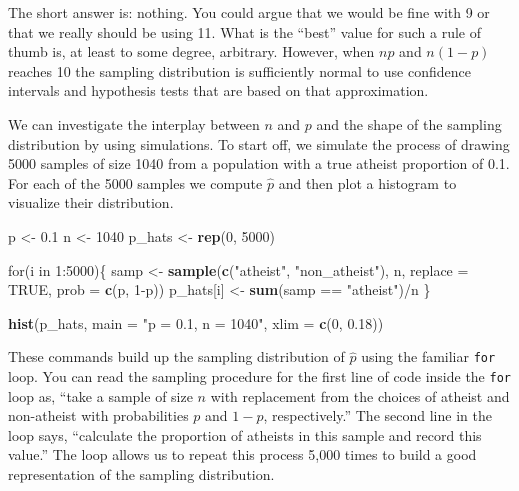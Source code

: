 \documentclass[]{book}
\newenvironment{Shaded}{\begin{snugshade}}{\end{snugshade}}
\newcommand{\KeywordTok}[1]{\textcolor[rgb]{0.13,0.29,0.53}{\textbf{{#1}}}}
\newcommand{\DataTypeTok}[1]{\textcolor[rgb]{0.13,0.29,0.53}{{#1}}}
\newcommand{\DecValTok}[1]{\textcolor[rgb]{0.00,0.00,0.81}{{#1}}}
\newcommand{\FloatTok}[1]{\textcolor[rgb]{0.00,0.00,0.81}{{#1}}}
\newcommand{\StringTok}[1]{\textcolor[rgb]{0.31,0.60,0.02}{{#1}}}
\newcommand{\OtherTok}[1]{\textcolor[rgb]{0.56,0.35,0.01}{{#1}}}
\newcommand{\NormalTok}[1]{{#1}}
\theoremstyle{definition}
\theoremstyle{definition}
\theoremstyle{remark}
\begin{document}
The short answer is: nothing. You could argue that we would be fine with
9 or that we really should be using 11. What is the ``best'' value for
such a rule of thumb is, at least to some degree, arbitrary. However,
when \(np\) and \(n(1-p)\) reaches 10 the sampling distribution is
sufficiently normal to use confidence intervals and hypothesis tests
that are based on that approximation.

We can investigate the interplay between \(n\) and \(p\) and the shape
of the sampling distribution by using simulations. To start off, we
simulate the process of drawing 5000 samples of size 1040 from a
population with a true atheist proportion of 0.1. For each of the 5000
samples we compute \(\hat{p}\) and then plot a histogram to visualize
their distribution.

\begin{Shaded}
\begin{Highlighting}[]
\NormalTok{p <-}\StringTok{ }\FloatTok{0.1}
\NormalTok{n <-}\StringTok{ }\DecValTok{1040}
\NormalTok{p_hats <-}\StringTok{ }\KeywordTok{rep}\NormalTok{(}\DecValTok{0}\NormalTok{, }\DecValTok{5000}\NormalTok{)}

\NormalTok{for(i in }\DecValTok{1}\NormalTok{:}\DecValTok{5000}\NormalTok{)\{}
  \NormalTok{samp <-}\StringTok{ }\KeywordTok{sample}\NormalTok{(}\KeywordTok{c}\NormalTok{(}\StringTok{"atheist"}\NormalTok{, }\StringTok{"non_atheist"}\NormalTok{), n, }\DataTypeTok{replace =} \OtherTok{TRUE}\NormalTok{, }\DataTypeTok{prob =} \KeywordTok{c}\NormalTok{(p, }\DecValTok{1}\NormalTok{-p))}
  \NormalTok{p_hats[i] <-}\StringTok{ }\KeywordTok{sum}\NormalTok{(samp ==}\StringTok{ "atheist"}\NormalTok{)/n}
\NormalTok{\}}

\KeywordTok{hist}\NormalTok{(p_hats, }\DataTypeTok{main =} \StringTok{"p = 0.1, n = 1040"}\NormalTok{, }\DataTypeTok{xlim =} \KeywordTok{c}\NormalTok{(}\DecValTok{0}\NormalTok{, }\FloatTok{0.18}\NormalTok{))}
\end{Highlighting}
\end{Shaded}

These commands build up the sampling distribution of \(\hat{p}\) using
the familiar \texttt{for} loop. You can read the sampling procedure for
the first line of code inside the \texttt{for} loop as, ``take a sample
of size \(n\) with replacement from the choices of atheist and
non-atheist with probabilities \(p\) and \(1 - p\), respectively.'' The
second line in the loop says, ``calculate the proportion of atheists in
this sample and record this value.'' The loop allows us to repeat this
process 5,000 times to build a good representation of the sampling
distribution.
\end{document}
